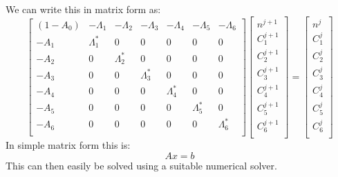 \documentclass[11pt,letterpaper,titlepage]{article}
\begin{document}
\newline
\noindent
We can write this in matrix form as: 
\begin{equation*}
\begin{bmatrix}
(1-A_0)	&	-\Lambda_1	&	-\Lambda_2	&	-\Lambda_3	&	-\Lambda_4	&	-\Lambda_5	&	-\Lambda_6 \\
-A_1	&	\Lambda_1^* &	0	&	0	&	0	&	0	&	0	 \\
-A_2	&	0	&	\Lambda_2^* &	0	&	0	&	0	&	0	 \\
-A_3	&	0	&	0	&	\Lambda_3^* &	0	&	0	&	0	 \\
-A_4	&	0	&	0	&	0	&	\Lambda_4^* &	0	&	0	 \\
-A_5	&	0	&	0	&	0	&	0	&	\Lambda_5^* &	0	 \\
-A_6	&	0	&	0	&	0	&	0	&	0	&	\Lambda_6^* 	 \\
\end{bmatrix}
\begin{bmatrix}
n^{j+1} \\
C_1^{j+1} \\
C_2^{j+1} \\
C_3^{j+1} \\
C_4^{j+1} \\
C_5^{j+1} \\
C_6^{j+1} \\
\end{bmatrix}
= 
\begin{bmatrix}
n^{j} \\
C_1^{j} \\
C_2^{j} \\
C_3^{j} \\
C_4^{j} \\
C_5^{j} \\
C_6^{j} \\
\end{bmatrix}
\end{equation*}
In simple matrix form this is:
\begin{equation*}
Ax=b
\end{equation*}
This can then easily be solved using a suitable numerical solver.



\newpage
{}
\end{document}
